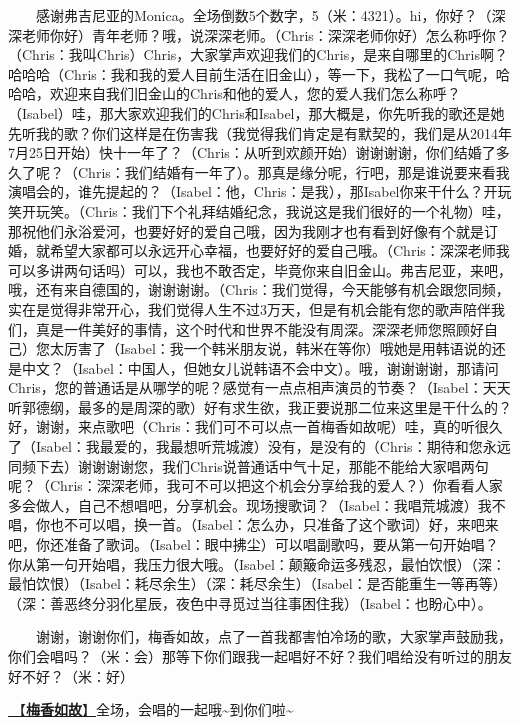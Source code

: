 \documentclass[]{ctexbook}
\begin{document}
  感谢弗吉尼亚的Monica。全场倒数5个数字，5（米：4321）。hi，你好？（深深老师你好）青年老师？哦，说深深老师。（Chris：深深老师你好）怎么称呼你？（Chris：我叫Chris）Chris，大家掌声欢迎我们的Chris，是来自哪里的Chris啊？哈哈哈（Chris：我和我的爱人目前生活在旧金山），等一下，我松了一口气呢，哈哈哈，欢迎来自我们旧金山的Chris和他的爱人，您的爱人我们怎么称呼？（Isabel）哇，那大家欢迎我们的Chris和Isabel，那大概是，你先听我的歌还是她先听我的歌？你们这样是在伤害我（我觉得我们肯定是有默契的，我们是从2014年7月25日开始）快十一年了？（Chris：从听到欢颜开始）谢谢谢谢，你们结婚了多久了呢？（Chris：我们结婚有一年了）。那真是缘分呢，行吧，那是谁说要来看我演唱会的，谁先提起的？（Isabel：他，Chris：是我），那Isabel你来干什么？开玩笑开玩笑。（Chris：我们下个礼拜结婚纪念，我说这是我们很好的一个礼物）哇，那祝他们永浴爱河，也要好好的爱自己哦，因为我刚才也有看到好像有个就是订婚，就希望大家都可以永远开心幸福，也要好好的爱自己哦。（Chris：深深老师我可以多讲两句话吗）可以，我也不敢否定，毕竟你来自旧金山。弗吉尼亚，来吧，哦，还有来自德国的，谢谢谢谢。（Chris：我们觉得，今天能够有机会跟您同频，实在是觉得非常开心，我们觉得人生不过3万天，但是有机会能有您的歌声陪伴我们，真是一件美好的事情，这个时代和世界不能没有周深。深深老师您照顾好自己）您太厉害了（Isabel：我一个韩米朋友说，韩米在等你）哦她是用韩语说的还是中文？（Isabel：中国人，但她女儿说韩语不会中文）。哦，谢谢谢谢，那请问Chris，您的普通话是从哪学的呢？感觉有一点点相声演员的节奏？（Isabel：天天听郭德纲，最多的是周深的歌）好有求生欲，我正要说那二位来这里是干什么的？好，谢谢，来点歌吧（Chris：我们可不可以点一首梅香如故呢）哇，真的听很久了（Isabel：我最爱的，我最想听荒城渡）没有，是没有的（Chris：期待和您永远同频下去）谢谢谢谢您，我们Chris说普通话中气十足，那能不能给大家唱两句呢？（Chris：深深老师，我可不可以把这个机会分享给我的爱人？）你看看人家多会做人，自己不想唱吧，分享机会。现场搜歌词？（Isabel：我唱荒城渡）我不唱，你也不可以唱，换一首。（Isabel：怎么办，只准备了这个歌词）好，来吧来吧，你还准备了歌词。（Isabel：眼中拂尘）可以唱副歌吗，要从第一句开始唱？你从第一句开始唱，我压力很大哦。（Isabel：颠簸命运多残忍，最怕饮恨）（深：最怕饮恨）（Isabel：耗尽余生）（深：耗尽余生）（Isabel：是否能重生一等再等）（深：善恶终分羽化星辰，夜色中寻觅过当往事困住我）（Isabel：也盼心中）。

  谢谢，谢谢你们，梅香如故，点了一首我都害怕冷场的歌，大家掌声鼓励我，你们会唱吗？（米：会）那等下你们跟我一起唱好不好？我们唱给没有听过的朋友好不好？（米：好）

\hyperref[plum-blossoms-fragrance-linger]{🎵【\textbf{梅香如故}】}全场，会唱的一起哦\textasciitilde 到你们啦\textasciitilde{}
\end{document}
